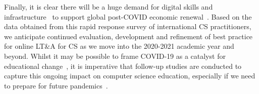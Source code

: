 \documentclass[conference]{IEEEtran}
\begin{document}



Finally, it is clear there will be a huge demand for digital skills
and
infrastructure~\cite{tryfonas+crick:petra2018,davenport-et-al:cep2019,davenport-et-al:educon2020,baker:2020}
to support global post-COVID economic
renewal~\cite{nadellaft:2020}. Based on the data obtained from this
rapid response survey of international CS practitioners, we anticipate
continued evaluation, development and refinement of best practice for
online LT\&A for CS as we move into the 2020-2021 academic year and
beyond. Whilst it may be possible to frame COVID-19 as a catalyst for
educational change~\cite{zhao:2020}, it is imperative that follow-up
studies are conducted to capture this ongoing impact on computer
science education, especially if we need to prepare for future
pandemics~\cite{strickland+zorpette:2020}.





 
\end{document}
